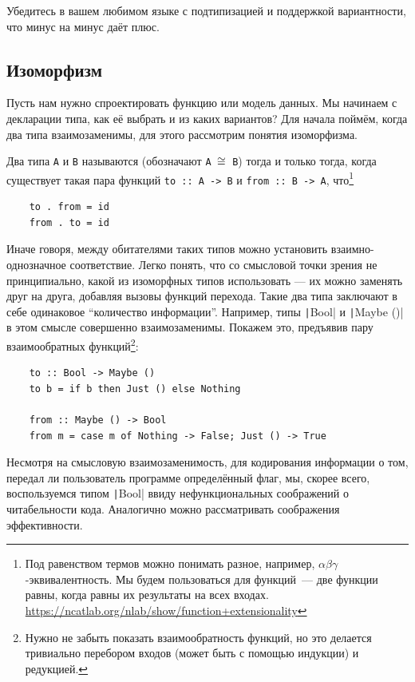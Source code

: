 \begin{task}
    Убедитесь в вашем любимом языке с подтипизацией и поддержкой вариантности, что минус на минус даёт плюс.
\end{task}

\subsection{Изоморфизм} \label{subsec:isomorphism}

Пусть нам нужно спроектировать функцию или модель данных.
Мы начинаем с декларации типа, как её выбрать и из каких вариантов?
Для начала поймём, когда два типа взаимозаменимы, для этого рассмотрим понятия изоморфизма.

Два типа \texttt{A} и \texttt{B} называются  (обозначают \texttt{A $\cong$ B}) тогда и только тогда, когда существует такая пара функций \texttt{to :: A -> B} и \texttt{from :: B -> A}, что\footnote{Под равенством термов можно понимать разное, например, $\alpha\beta\gamma$-эквивалентность. Мы будем пользоваться  для функций~--- две функции равны, когда равны их результаты на всех входах. \url{https://ncatlab.org/nlab/show/function+extensionality}}
\begin{verbatim}
    to . from = id
    from . to = id
\end{verbatim}

Иначе говоря, между обитателями таких типов можно установить взаимно-однозначное соответствие.
Легко понять, что со смысловой точки зрения не принципиально, какой из изоморфных типов использовать --- их можно заменять друг на друга, добавляя вызовы функций перехода.
Такие два типа заключают в себе одинаковое ``количество информации''.
Например, типы \texttt|Bool| и \texttt|Maybe ()| в этом смысле совершенно взаимозаменимы.
Покажем это, предъявив пару взаимообратных функций\footnote{Нужно не забыть показать взаимообратность функций, но это делается тривиально перебором входов (может быть с помощью индукции) и редукцией.}:
\begin{verbatim}
    to :: Bool -> Maybe ()
    to b = if b then Just () else Nothing

    from :: Maybe () -> Bool
    from m = case m of Nothing -> False; Just () -> True
\end{verbatim}

Несмотря на смысловую взаимозаменимость, для кодирования информации о том, передал ли пользователь программе определённый флаг, мы, скорее всего, воспользуемся типом \texttt|Bool| ввиду нефункциональных соображений о читабельности кода.
Аналогично можно рассматривать соображения эффективности.

